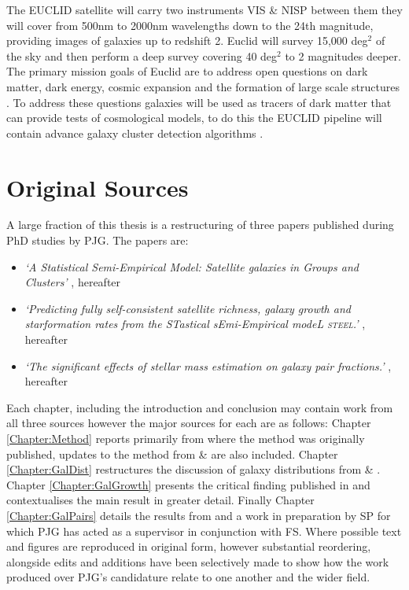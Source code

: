 The EUCLID satellite will carry two instruments VIS \& NISP between them they will cover from 500nm to 2000nm wavelengths down to the 24th magnitude, providing images of galaxies up to redshift 2. Euclid will survey 15,000 deg$^2$ of the sky and then perform a deep survey covering 40 deg$^2$ to 2 magnitudes deeper. The primary mission goals of Euclid are to address open questions on dark matter, dark energy, cosmic expansion and the formation of large scale structures \cite{Amendola2018CosmologySatellite}. To address these questions galaxies will be used as tracers of dark matter that can provide tests of cosmological models, to do this the EUCLID pipeline will contain advance galaxy cluster detection algorithms \cite{EuclidCollaboration2019EuclidSelection}. 

\section{Original Sources}

A large fraction of this thesis is a restructuring of three papers published during PhD studies by PJG. The papers are:
\begin{itemize}
    \item \textit{`A Statistical Semi-Empirical Model: Satellite galaxies in Groups and Clusters'}  \citet{Grylls2019AClusters}, hereafter 
    \item \textit{`Predicting fully self-consistent satellite richness, galaxy growth and starformation rates from the STastical sEmi-Empirical modeL \textsc{steel}.'} \citet{Grylls2020PredictingSTEEL}, hereafter 
    \item \textit{`The significant effects of stellar mass estimation on galaxy pair fractions.'} \citet{Grylls2020TheFractions}, hereafter 
\end{itemize}

Each chapter, including the introduction and conclusion may contain work from all three sources however the major sources for each are as follows: Chapter \ref{Chapter:Method} reports primarily from  where the method was originally published, updates to the method from  \&  are also included. Chapter \ref{Chapter:GalDist} restructures the discussion of galaxy distributions from  \& . Chapter \ref{Chapter:GalGrowth} presents the critical finding published in  and contextualises the main result in greater detail. Finally Chapter \ref{Chapter:GalPairs} details the results from  and a work in preparation by SP for which PJG has acted as a supervisor in conjunction with FS. Where possible text and figures are reproduced in original form, however substantial reordering, alongside edits and additions have been selectively made to show how the work produced over PJG's candidature relate to one another and the wider field.  
